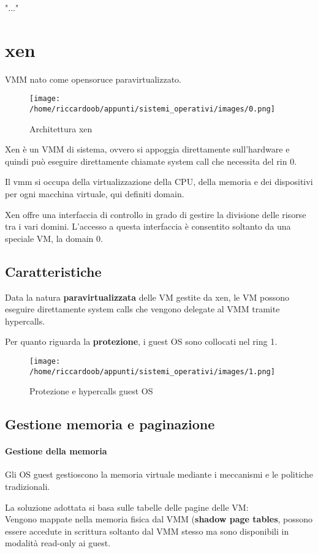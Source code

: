 "..."
\chapter{xen}
VMM nato come opensoruce paravirtualizzato.
\begin{figure}[H]
	\caption{Architettura xen}
	\centering
	\texttt{[image: /home/riccardoob/appunti/sistemi\_operativi/images/0.png]}
\end{figure}
Xen è un VMM di sistema, ovvero si appoggia direttamente sull'hardware e quindi può eseguire direttamente chiamate system call che necessita del rin 0.

Il vmm si occupa della virtualizzazione della CPU, della memoria e dei dispositivi per ogni macchina virtuale, qui definiti domain.

Xen offre una interfaccia di controllo in grado di gestire la divisione delle risorse tra i vari domini.
L'accesso a questa interfaccia è consentito soltanto da una speciale VM, la domain 0.

\section{Caratteristiche}
Data la natura \textbf{paravirtualizzata} delle VM gestite da xen, le VM possono eseguire direttamente system calls che vengono delegate al VMM tramite hypercalls.

Per quanto riguarda la \textbf{protezione}, i guest OS sono collocati nel ring 1.

\begin{figure}[H]
	\caption{Protezione e hypercalls guest OS}
	\centering
	\texttt{[image: /home/riccardoob/appunti/sistemi\_operativi/images/1.png]}
\end{figure}

\section{Gestione memoria e paginazione}

\subsubsection{Gestione della memoria}
Gli OS guest gestioscono la memoria virtuale mediante i meccanismi e le politiche tradizionali.

La soluzione adottata si basa sulle tabelle delle pagine delle VM:\\
Vengono mappate nella memoria fisica dal VMM (\textbf{shadow page tables}, possono essere accedute in scrittura soltanto dal VMM stesso ma sono disponibili in modalità read-only ai guest.

